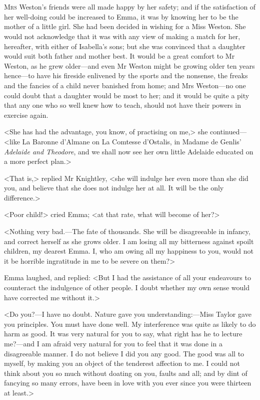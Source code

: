 \chapter[Chapter \thechapter]{}
\lettrine[lraise=0.3]{M}{rs} Weston's friends were all made happy by her safety; and if the satisfaction of her well-doing could be increased to Emma, it was by knowing her to be the mother of a little girl. She had been decided in wishing for a Miss Weston. She would not acknowledge that it was with any view of making a match for her, hereafter, with either of Isabella's sons; but she was convinced that a daughter would suit both father and mother best. It would be a great comfort to Mr Weston, as he grew older—and even Mr Weston might be growing older ten years hence—to have his fireside enlivened by the sports and the nonsense, the freaks and the fancies of a child never banished from home; and Mrs Weston—no one could doubt that a daughter would be most to her; and it would be quite a pity that any one who so well knew how to teach, should not have their powers in exercise again.

<She has had the advantage, you know, of practising on me,> she continued—<like La Baronne d'Almane on La Comtesse d'Ostalis, in Madame de Genlis' \textit{Adelaide and Theodore}, and we shall now see her own little Adelaide educated on a more perfect plan.>

<That is,> replied Mr Knightley, <she will indulge her even more than she did you, and believe that she does not indulge her at all. It will be the only difference.>

<Poor child!> cried Emma; <at that rate, what will become of her?>

<Nothing very bad.—The fate of thousands. She will be disagreeable in infancy, and correct herself as she grows older. I am losing all my bitterness against spoilt children, my dearest Emma. I, who am owing all my happiness to you, would not it be horrible ingratitude in me to be severe on them?>

Emma laughed, and replied: <But I had the assistance of all your endeavours to counteract the indulgence of other people. I doubt whether my own sense would have corrected me without it.>

<Do you?—I have no doubt. Nature gave you understanding:—Miss Taylor gave you principles. You must have done well. My interference was quite as likely to do harm as good. It was very natural for you to say, what right has he to lecture me?—and I am afraid very natural for you to feel that it was done in a disagreeable manner. I do not believe I did you any good. The good was all to myself, by making you an object of the tenderest affection to me. I could not think about you so much without doating on you, faults and all; and by dint of fancying so many errors, have been in love with you ever since you were thirteen at least.>

